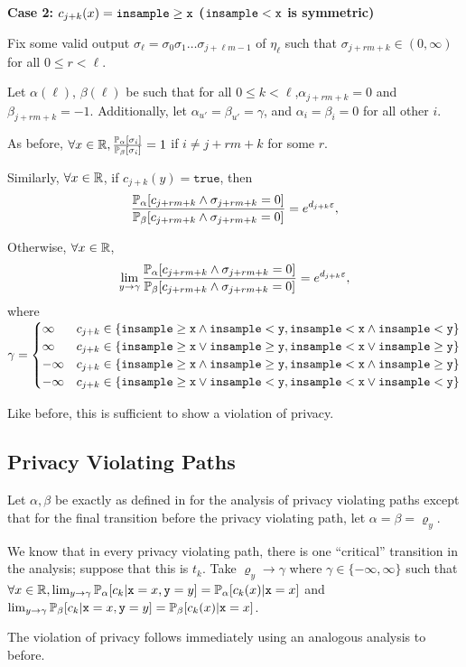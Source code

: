 \textbf{Case 2: $c_{j+k}(x) =\gguard[\texttt{x}]$ ($\lguard[\texttt{x}]$ is symmetric)}

Fix some valid output $\sigma_\ell = \sigma_0\sigma_1\ldots\sigma_{j+\ell m-1}$ of $\eta_\ell$ such that $\sigma_{j+rm+k}\in (0, \infty)$ for all $0\leq r< \ell$. 

Let $\alpha(\ell)$, $\beta(\ell)$ be such that for all $0\leq k < \ell$,$\alpha_{j+rm+k}=0$ and $ \beta_{j+rm+k} = -1$. Additionally, let $\alpha_{u'} = \beta_{u'} = \gamma$, and $\alpha_i=\beta_i=0$ for all other $i$. 


As before, $\forall x\in \RR, \frac{\PP_\alpha[\sigma_{i}]}{\PP_\beta[\sigma_i]} = 1$ if $i\neq j+rm+k$ for some $r$.

Similarly, $\forall x\in \RR$, if $c_{j+k}(y)=\texttt{true}$, then \[
	\frac{\PP_\alpha[c_{j+rm+k}\land \sigma_{j+rm+k}=0]}{\PP_\beta[c_{j+rm+k}\land\sigma_{j+rm+k}=0]} = e^{d_{j+k}\varepsilon},	
\]

Otherwise, $\forall x\in \RR$, \[
	\lim_{y\to\gamma}\frac{\PP_\alpha[c_{j+rm+k}\land \sigma_{j+rm+k}=0]}{\PP_\beta[c_{j+rm+k}\land\sigma_{j+rm+k}=0]} = e^{d_{j+k}\varepsilon},	
\]
where $\gamma = \begin{cases}
	\infty & c_{j+k}\in \{\gguard[\texttt{x}]\land \lguard[\texttt{y}],\lguard[\texttt{x}]\land \lguard[\texttt{y}]\}\\
	\infty & c_{j+k}\in \{\gguard[\texttt{x}]\lor \gguard[\texttt{y}], \lguard[\texttt{x}] \lor \gguard[\texttt{y}]\}\\
	-\infty & c_{j+k}\in \{\gguard[\texttt{x}]\land \gguard[\texttt{y}],\lguard[\texttt{x}]\land \gguard[\texttt{y}]\}\\
	-\infty & c_{j+k}\in \{\gguard[\texttt{x}]\lor \lguard[\texttt{y}], \lguard[\texttt{x}] \lor \lguard[\texttt{y}]\}\\
\end{cases}$

Like before, this is sufficient to show a violation of privacy. 

\subsection{Privacy Violating Paths}

Let $\alpha, \beta$ be exactly as defined in \cite{chadhaLinearTimeDecidability2021} for the analysis of privacy violating paths except that for the final transition before the privacy violating path, let $\alpha = \beta = \varrho_y$. 

We know that in every privacy violating path, there is one ``critical'' transition in the analysis; suppose that this is $t_k$. Take $\varrho_y\to\gamma$ where $\gamma\in \{-\infty, \infty\}$ such that $\forall x\in \RR, \lim_{y\to\gamma}\PP_\alpha[c_k|\texttt{x}=x, \texttt{y}=y]=\PP_\alpha[c_k(x)|\texttt{x}=x]$ and $\lim_{y\to\gamma}\PP_\beta[c_k|\texttt{x}=x, \texttt{y}=y]=\PP_\beta[c_k(x)|\texttt{x}=x]$.

The violation of privacy follows immediately using an analogous analysis to before. 